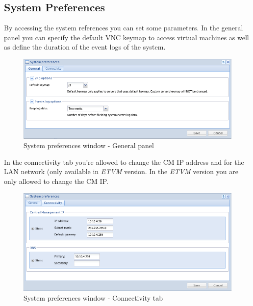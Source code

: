 \subsection{System Preferences}
By accessing the system references you can set some parameters. 
In the general panel you can specify the default VNC keymap to access virtual machines as well as define the duration of the event logs of the system.
 
\begin{figure}[H]
        \begin{center}
        \includegraphics[scale=0.5]{screenshots/preferences_general.png}
        \caption{System preferences window - General panel}
        \label{fig:preferences_general}
        \end{center}
\end{figure}

In the connectivity tab you're allowed to change the CM IP address and for the LAN network (only available in \emph{ETVM} version. In the \emph{ETVM} version you are only allowed to change the CM IP.

\begin{figure}[H]
        \begin{center}
        \includegraphics[scale=0.5]{screenshots/preferences_conn.png}
        \caption{System preferences window - Connectivity tab}
        \label{fig:preferences_conn}
        \end{center}
\end{figure}

